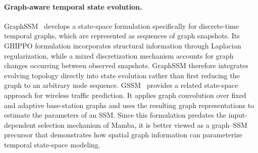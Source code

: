 \documentclass[acmsmall]{acmart}
\begin{document}
\paragraph{\textbf{Graph-aware temporal state evolution.}}
GraphSSM~\cite{li2024state} develops a state-space formulation specifically
for discrete-time temporal graphs, which are represented as sequences of graph
snapshots. Its GHIPPO formulation incorporates structural information through
Laplacian regularization, while a mixed discretization mechanism accounts for
graph changes occurring between observed snapshots. GraphSSM therefore
integrates evolving topology directly into state evolution rather than first
reducing the graph to an arbitrary node sequence.
GSSM~\cite{zhou2024graph} provides a related state-space approach for wireless
traffic prediction. It applies graph convolution over fixed and adaptive
base-station graphs and uses the resulting graph representations to estimate
the parameters of an SSM. Since this formulation predates the
input-dependent selection mechanism of Mamba, it is better viewed as a
graph--SSM precursor that demonstrates how spatial graph information can
parameterize temporal state-space modeling.
\end{document}
